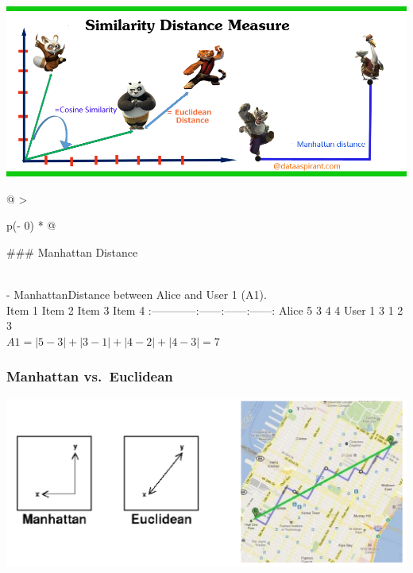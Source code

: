 \documentclass[
]{article}
\begin{document}
\includegraphics{images/rs9.png}

\begin{longtable}[]{@{}
  >{\raggedright\arraybackslash}p{(\columnwidth - 0\tabcolsep) * }@{}}
\toprule
\begin{minipage}[b]{\linewidth}\raggedright
\#\#\# Manhattan Distance
\end{minipage} \\
\midrule
\endhead
- ManhattanDistance between Alice and User 1 (A1). \\
\textbar{} \textbar{} Item 1\textbar{} Item 2\textbar{} Item 3\textbar{}
Item 4\textbar{}
\textbar:------\textbar------:\textbar------:\textbar------:\textbar------:\textbar{}
\textbar Alice \textbar{} 5\textbar{} 3\textbar{} 4\textbar{}
4\textbar{} \textbar User 1 \textbar{} 3\textbar{} 1\textbar{}
2\textbar{} 3\textbar{} \\
\(A1  = |5-3| + |3-1|+|4-2|+|4-3| = 7\) \\
\bottomrule
\end{longtable}

\hypertarget{manhattan-vs.-euclidean}{%
\subsubsection{Manhattan vs.~Euclidean}\label{manhattan-vs.-euclidean}}

\includegraphics{images/rs11.png}
\end{document}
